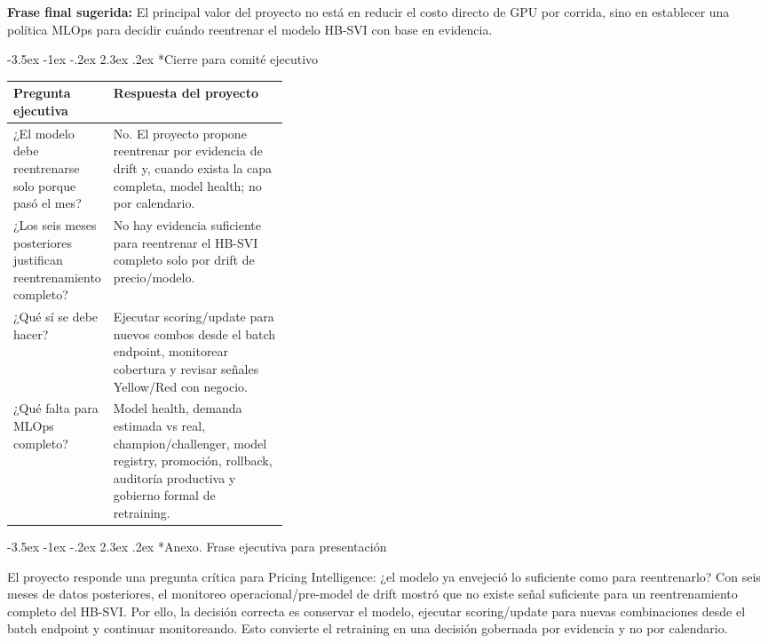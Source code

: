 \documentclass[11pt,letterpaper]{article}
\makeatletter
\renewcommand\section{\@startsection{section}{1}{\z@}
  {-3.5ex \@plus -1ex \@minus -.2ex}
  {2.3ex \@plus .2ex}
  {\Large\bfseries\sffamily\color{azulTec}}}
\newcommand{\statusbox}[1]{\colorbox{verdeClaro}{\parbox{\dimexpr\linewidth-2\fboxsep}{#1}}}
\makeatother
\begin{document}
\statusbox{\textbf{Frase final sugerida:} El principal valor del proyecto no está en reducir el costo directo de GPU por corrida, sino en establecer una política MLOps para decidir cuándo reentrenar el modelo HB-SVI con base en evidencia.}

\section*{Cierre para comité ejecutivo}

\begin{tabularx}{\linewidth}{L{0.36\linewidth}Y}
\toprule
\textbf{Pregunta ejecutiva} & \textbf{Respuesta del proyecto} \\
\midrule
¿El modelo debe reentrenarse solo porque pasó el mes? & No. El proyecto propone reentrenar por evidencia de drift y, cuando exista la capa completa, model health; no por calendario. \\
¿Los seis meses posteriores justifican reentrenamiento completo? & No hay evidencia suficiente para reentrenar el HB-SVI completo solo por drift de precio/modelo. \\
¿Qué sí se debe hacer? & Ejecutar scoring/update para nuevos combos desde el batch endpoint, monitorear cobertura y revisar señales Yellow/Red con negocio. \\
¿Qué falta para MLOps completo? & Model health, demanda estimada vs real, champion/challenger, model registry, promoción, rollback, auditoría productiva y gobierno formal de retraining. \\
\bottomrule
\end{tabularx}

\section*{Anexo. Frase ejecutiva para presentación}

El proyecto responde una pregunta crítica para Pricing Intelligence: ¿el modelo ya envejeció lo suficiente como para reentrenarlo? Con seis meses de datos posteriores, el monitoreo operacional/pre-model de drift mostró que no existe señal suficiente para un reentrenamiento completo del HB-SVI. Por ello, la decisión correcta es conservar el modelo, ejecutar scoring/update para nuevas combinaciones desde el batch endpoint y continuar monitoreando. Esto convierte el retraining en una decisión gobernada por evidencia y no por calendario.
\end{document}
